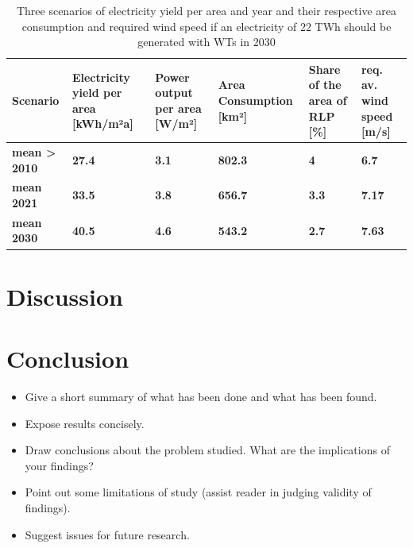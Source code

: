 \documentclass[a4paper,11pt]{article}
\begin{document}
\begin{table}[H]

\caption{\label{tab:table2}Three scenarios of electricity yield per area and year and their respective area consumption 
  and required wind speed if an electricity of 22 TWh should be generated with WTs in 2030}
\centering
\begin{tabular}[t]{>{\raggedright\arraybackslash}p{2.2cm}>{\raggedright\arraybackslash}p{2.2cm}>{\raggedright\arraybackslash}p{2.2cm}>{\raggedright\arraybackslash}p{2.2cm}>{\raggedright\arraybackslash}p{2.2cm}>{\raggedright\arraybackslash}p{2.2cm}}
\toprule
Scenario & Electricity yield per area [kWh/m²a] & Power output per area [W/m²] & Area Consumption [km²] & Share of the area of RLP [\%] & req. av. wind speed [m/s]\\
\midrule
\textbf{mean > 2010} & \textbf{27.4} & \textbf{3.1} & \textbf{802.3} & \textbf{4} & \textbf{6.7}\\
\midrule
\textbf{mean 2021} & \textbf{33.5} & \textbf{3.8} & \textbf{656.7} & \textbf{3.3} & \textbf{7.17}\\
\midrule
\textbf{mean 2030} & \textbf{40.5} & \textbf{4.6} & \textbf{543.2} & \textbf{2.7} & \textbf{7.63}\\
\midrule
\bottomrule
\end{tabular}
\end{table}
\hypertarget{discussion}{%
\section{Discussion}\label{discussion}}

\hypertarget{conclusion}{%
\section{Conclusion}\label{conclusion}}
\begin{itemize}
\item
  Give a short summary of what has been done and what has been found.
\item
  Expose results concisely.
\item
  Draw conclusions about the problem studied. What are the implications of your
  findings?
\item
  Point out some limitations of study (assist reader in judging validity of
  findings).
\item
  Suggest issues for future research.
\end{itemize}
\newpage
\end{document}
